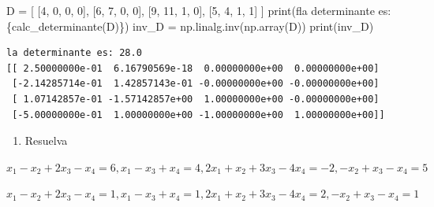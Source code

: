 \documentclass[
  letterpaper,
  DIV=11,
  numbers=noendperiod]{scrartcl}
\newenvironment{Shaded}{\begin{snugshade}}{\end{snugshade}}
\newcommand{\BuiltInTok}[1]{\textcolor[rgb]{0.00,0.23,0.31}{#1}}
\newcommand{\DecValTok}[1]{\textcolor[rgb]{0.68,0.00,0.00}{#1}}
\newcommand{\NormalTok}[1]{\textcolor[rgb]{0.00,0.23,0.31}{#1}}
\newcommand{\OperatorTok}[1]{\textcolor[rgb]{0.37,0.37,0.37}{#1}}
\newcommand{\SpecialCharTok}[1]{\textcolor[rgb]{0.37,0.37,0.37}{#1}}
\newcommand{\SpecialStringTok}[1]{\textcolor[rgb]{0.13,0.47,0.30}{#1}}
\providecommand{\tightlist}{%
  \setlength{\itemsep}{0pt}\setlength{\parskip}{0pt}}\usepackage{longtable,booktabs,array}
\begin{document}
\begin{Shaded}
\begin{Highlighting}[]
\NormalTok{D }\OperatorTok{=}\NormalTok{ [}
\NormalTok{    [}\DecValTok{4}\NormalTok{, }\DecValTok{0}\NormalTok{, }\DecValTok{0}\NormalTok{, }\DecValTok{0}\NormalTok{],}
\NormalTok{    [}\DecValTok{6}\NormalTok{, }\DecValTok{7}\NormalTok{, }\DecValTok{0}\NormalTok{, }\DecValTok{0}\NormalTok{],}
\NormalTok{    [}\DecValTok{9}\NormalTok{, }\DecValTok{11}\NormalTok{, }\DecValTok{1}\NormalTok{, }\DecValTok{0}\NormalTok{],}
\NormalTok{    [}\DecValTok{5}\NormalTok{, }\DecValTok{4}\NormalTok{, }\DecValTok{1}\NormalTok{, }\DecValTok{1}\NormalTok{]}
\NormalTok{]}
\BuiltInTok{print}\NormalTok{(}\SpecialStringTok{f\textquotesingle{}la determinante es: }\SpecialCharTok{\{}\NormalTok{calc\_determinante(D)}\SpecialCharTok{\}}\SpecialStringTok{\textquotesingle{}}\NormalTok{)}
\NormalTok{inv\_D }\OperatorTok{=}\NormalTok{ np.linalg.inv(np.array(D))}
\BuiltInTok{print}\NormalTok{(inv\_D)}
\end{Highlighting}
\end{Shaded}

\begin{verbatim}
la determinante es: 28.0
[[ 2.50000000e-01  6.16790569e-18  0.00000000e+00  0.00000000e+00]
 [-2.14285714e-01  1.42857143e-01 -0.00000000e+00 -0.00000000e+00]
 [ 1.07142857e-01 -1.57142857e+00  1.00000000e+00 -0.00000000e+00]
 [-5.00000000e-01  1.00000000e+00 -1.00000000e+00  1.00000000e+00]]
\end{verbatim}

\begin{enumerate}
\def\labelenumi{\arabic{enumi}.}
\setcounter{enumi}{2}
\tightlist
\item
  Resuelva
\end{enumerate}

\(x_1 - x_2 + 2x_3 - x_4 = 6, x_1-x_3+x_4=4,2x_1+x_2+3x_3-4x_4=-2,-x_2+x_3-x_4=5\)

\(x_1 - x_2 + 2x_3 - x_4 = 1, x_1-x_3+x_4=1,2x_1+x_2+3x_3-4x_4=2,-x_2+x_3-x_4=1\)
\end{document}
